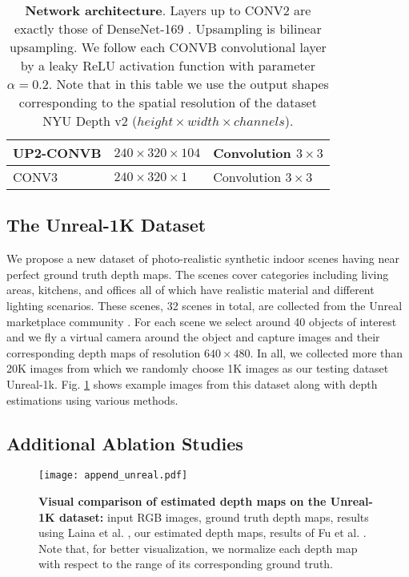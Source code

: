 \documentclass[10pt,twocolumn,letterpaper]{article}
\begin{document}
\begin{table}[t]
{\begin{tabular}{ |l|l|l| }
\hline
UP2-CONVB & $240 \times 320 \times 104$ & Convolution $3 \times 3$ \\ 
\hline
CONV3 & $240 \times 320 \times 1$ & Convolution $3 \times 3$ \\ 
\hline
\end{tabular}}
\bigskip
\caption{\textbf{Network architecture}. Layers up to CONV2 are exactly those of DenseNet-169 \cite{huang2017densely}. Upsampling is bilinear upsampling. We follow each CONVB convolutional layer by a leaky ReLU activation function \cite{Maas13LeRELU} with parameter $\alpha=0.2$. Note that in this table we use the output shapes corresponding to the spatial resolution of the dataset NYU Depth v2 ($height \times width \times channels$).}
\label{table:1}
\end{table}

\subsection{The Unreal-1K Dataset}

We propose a new dataset of photo-realistic synthetic indoor scenes having near perfect ground truth depth maps. The scenes cover categories including living areas, kitchens, and offices all of which have realistic material and different lighting scenarios. These scenes, 32 scenes in total, are collected from the Unreal marketplace community \cite{UnrealMarket2018}. For each scene we select around 40 objects of interest and we fly a virtual camera around the object and capture images and their corresponding depth maps of resolution $640 \times 480$. In all, we collected more than 20K images from which we randomly choose 1K images as our testing dataset Unreal-1k. Fig. \ref{fig:append-fig1} shows example images from this dataset along with depth estimations using various methods.


\subsection{Additional Ablation Studies}
\label{sec:sup_ablation}

\begin{figure}[t]
\begin{center}
\texttt{[image: append\_unreal.pdf]}
\end{center}
   \caption{\textbf{Visual comparison of estimated depth maps on the Unreal-1K dataset:} input RGB images, ground truth depth maps, results using Laina et al. \cite{Laina2016}, our estimated depth maps, results of Fu et al. \cite{Fu2018DeepOR}. Note that, for better visualization, we normalize each depth map with respect to the range of its corresponding ground truth.}
\label{fig:append-fig1}
\end{figure}
\end{document}

